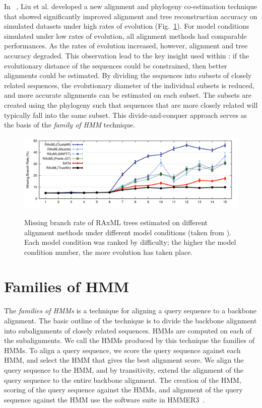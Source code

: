 In ~\cite{Liu2009}, Liu et al. developed a new alignment and phylogeny co-estimation technique that showed significantly improved alignment and tree reconstruction accuracy on simulated datasets under high rates of evolution (Fig.~\ref{hmmfamily:sate}).  For model conditions simulated under low rates of evolution, all alignment methods had comparable performances.  As the rates of evolution increased, however, alignment and tree accuracy degraded.  This observation lead to the key insight used within \sate: if the evolutionary distance of the sequences could be constrained, then better alignments could be estimated.  By dividing the sequences into subsets of closely related sequences, the evolutionary diameter of the individual subsets is reduced, and more accurate alignments can be estimated on each subset.  The subsets are created using the phylogeny such that sequences that are more closely related will typically fall into the same subset.  This divide-and-conquer approach serves as the basis of the \emph{family of HMM} technique.

\begin{figure}[htbp]
\centering
{\includegraphics[width=1.00\textwidth]{sepp/sate}}
\caption[Tree error of RAxML trees estimated on different alignment methods.]{Missing branch rate of RAxML trees estimated on different alignment methods under different model conditions (taken from \cite{Liu2009}).  Each model condition was ranked by difficulty; the higher the model condition number, the more evolution has taken place.} 
\label{hmmfamily:sate}
\end{figure}

\section{Families of HMM}\label{hmmfamily:algorithm}
The \emph{families of HMMs} is a technique for aligning a query sequence to a backbone alignment.  The basic outline of the technique is to divide the backbone alignment into subalignments of closely related sequences.  HMMs are computed on each of the subalignments.  We call the HMMs produced by this technique the families of HMMs.  To align a query sequence, we score the query sequence against each HMM, and select the HMM that gives the best alignment score.  We align the query sequence to the HMM, and by transitivity, extend the alignment of the query sequence to the entire backbone alignment.  The creation of the HMM, scoring of the query sequence against the HMMs, and alignment of the query sequence against the HMM use the software suite in HMMER3~\cite{hmmer}.

